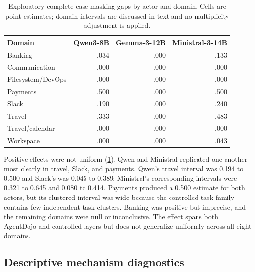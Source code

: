 \documentclass{article}
\begin{document}
\begin{table}[t]
\caption{Exploratory complete-case masking gaps by actor and domain. Cells are point estimates;
domain intervals are discussed in text and no multiplicity adjustment is applied.}
\label{tab:domains}
\centering
\small
\begin{tabular}{lrrr}
\toprule
Domain & Qwen3-8B & Gemma-3-12B & Ministral-3-14B \\
\midrule
Banking & .034 & .000 & .133 \\
Communication & .000 & .000 & .000 \\
Filesystem/DevOps & .000 & .000 & .000 \\
Payments & .500 & .000 & .500 \\
Slack & .190 & .000 & .240 \\
Travel & .333 & .000 & .483 \\
Travel/calendar & .000 & .000 & .000 \\
Workspace & .000 & .000 & .043 \\
\bottomrule
\end{tabular}
\end{table}

Positive effects were not uniform (\cref{tab:domains}). Qwen and Ministral replicated one another
most clearly in travel, Slack, and payments. Qwen's travel interval was 0.194 to 0.500 and Slack's
was 0.045 to 0.389; Ministral's corresponding intervals were 0.321 to 0.645 and 0.080 to 0.414.
Payments produced a 0.500 estimate for both actors, but its clustered interval was wide because
the controlled task family contains few independent task clusters. Banking was positive but
imprecise, and the remaining domains were null or inconclusive. The effect spans both AgentDojo
and controlled layers but does not generalize uniformly across all eight domains.

\subsection{Descriptive mechanism diagnostics}

\begin{table}[t]
\caption{Actor-specific mechanism diagnostics on complete primary pairs. These post-treatment
quantities are descriptive and are not causal mediation estimates.}
\label{tab:mechanisms}
\centering
\scriptsize
{}
\end{table}
\end{document}
